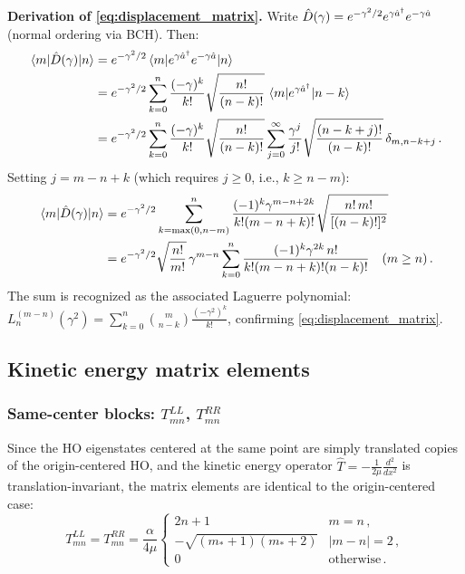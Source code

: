 \textbf{Derivation of \cref{eq:displacement_matrix}.}
Write $\hat{D}(\gamma) = e^{-\gamma^2/2}e^{\gamma\hat{a}^{\dagger}}e^{-\gamma\hat{a}}$ (normal ordering via BCH).
Then:
\begin{align}
  \mel{m}{\hat{D}(\gamma)}{n}
  &= e^{-\gamma^2/2}\mel{m}{e^{\gamma\hat{a}^{\dagger}}e^{-\gamma\hat{a}}}{n}\notag\\
  &= e^{-\gamma^2/2}\sum_{k=0}^{n}\frac{(-\gamma)^k}{k!}\sqrt{\frac{n!}{(n-k)!}}
     \,\mel{m}{e^{\gamma\hat{a}^{\dagger}}}{n-k}\notag\\
  &= e^{-\gamma^2/2}\sum_{k=0}^{n}\frac{(-\gamma)^k}{k!}\sqrt{\frac{n!}{(n-k)!}}
     \sum_{j=0}^{\infty}\frac{\gamma^j}{j!}\sqrt{\frac{(n-k+j)!}{(n-k)!}}\,\delta_{m,n-k+j}\,.
\end{align}
Setting $j = m - n + k$ (which requires $j \geq 0$, i.e., $k \geq n - m$):
\begin{align}
  \mel{m}{\hat{D}(\gamma)}{n}
  &= e^{-\gamma^2/2}\sum_{k=\max(0,n-m)}^{n}
     \frac{(-1)^k\gamma^{m-n+2k}}{k!(m-n+k)!}\sqrt{\frac{n!\,m!}{[(n-k)!]^2}}\notag\\
  &= e^{-\gamma^2/2}\sqrt{\frac{n!}{m!}}\,\gamma^{m-n}
     \sum_{k=0}^{n}\frac{(-1)^k\gamma^{2k}\,n!}{k!(m-n+k)!(n-k)!}\quad (m\geq n)\,.
\end{align}
The sum is recognized as the associated Laguerre polynomial:
$L_n^{(m-n)}(\gamma^2) = \sum_{k=0}^{n}\binom{m}{n-k}\frac{(-\gamma^2)^k}{k!}$, confirming \cref{eq:displacement_matrix}.

\subsection{Kinetic energy matrix elements}\label{sec:shifted_kinetic}

\subsubsection{Same-center blocks: $T_{mn}^{LL}$, $T_{mn}^{RR}$}

Since the HO eigenstates centered at the same point are simply translated copies of
the origin-centered HO, and the kinetic energy operator $\hat{T} = -\frac{1}{2\mu}\frac{d^2}{dx^2}$
is translation-invariant, the matrix elements are identical to the origin-centered case:
\begin{equation}
  T_{mn}^{LL} = T_{mn}^{RR} = \frac{\alpha}{4\mu}
  \begin{cases}
    2n+1 & m = n\,,\\
    -\sqrt{(m_*+1)(m_*+2)} & |m-n|=2\,,\\
    0 & \text{otherwise}\,.
  \end{cases}
\end{equation}

